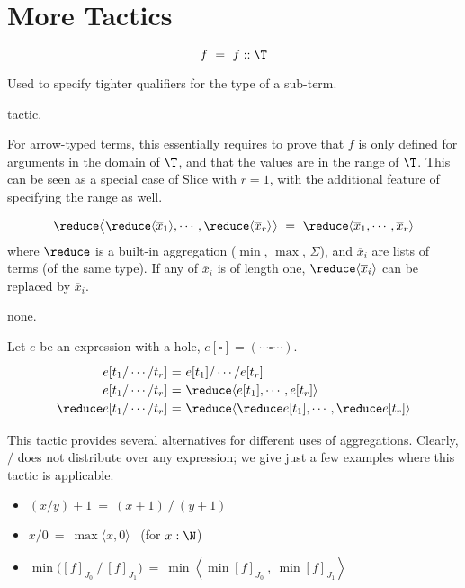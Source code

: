 \section{More Tactics}
\label{annex:more tactics}

 \label{tactics:Shrink}
\[f ~=~ f :: \T\] 

Used to specify tighter qualifiers for the type of a sub-term.

\Obligations tactic.

For arrow-typed terms, this essentially requires to prove that $f$ 
is only defined for arguments in the domain of $\T$, and that the values are in the range of $\T$.
This can be seen as a special case of {\sf Slice} with $r=1$, with the additional
feature of specifying the range as well.

\[\reduce\big\langle \reduce\langle\overline x_1\rangle,\cdots, \reduce\langle\overline x_r\rangle\big\rangle ~=~ \reduce \langle \overline x_1, \cdots, \overline x_r\rangle\]
%
where $\reduce$ is a built-in aggregation ($\min$, $\max$, $\Sigma$), 
and $\overline x_i$ are lists of terms (of the same type).
If any of $\overline x_i$ is of length one, $\reduce\langle\overline x_i\rangle$ can be
replaced by $\overline x_i$.

\Obligations none.

\vspace{3mm}
Let $e$ be an expression with a hole, $e[\square] = (\cdots \square \cdots)$.
%
\[\renewcommand\arraystretch{1.2}
  \begin{array}{@{}r@{~}c@{~}l@{}}
    e[t_1/\cdots/t_r] &=& e[t_1] / \cdots / e[t_r] \\
    e[t_1/\cdots/t_r] &=& \reduce\langle e[t_1],\cdots,e[t_r]\rangle \\
    \reduce e[t_1/\cdots/t_r] &=& \reduce\langle \reduce e[t_1],\cdots,\reduce e[t_r]\rangle
  \end{array}\]

This tactic provides several alternatives for different uses of aggregations.
Clearly, $\big/$ does not distribute over any expression; we give just a few examples
where this tactic is applicable.
\begin{itemize}
  \item $(x/y)+1 ~=~ (x+1)~/~(y+1)$
  \item $x/0 ~=~ \max\langle x,0\rangle$ ~(for $x:\N$)
  \item $\min \big([f]_{J_0}~\big/~[f]_{J_1}\big) ~=~
         \min\left\langle \min [f]_{J_0} ~,~ \min [f]_{J_1}\right\rangle$
\end{itemize}

